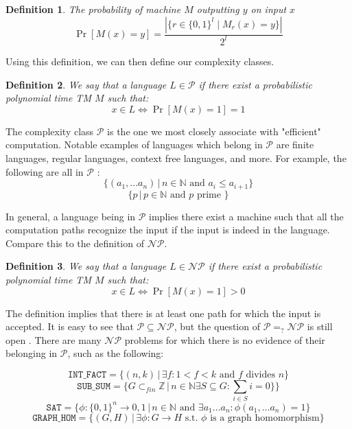 \documentclass{article}
\newtheorem{definition}{Definition}
\begin{document}
\begin{definition} The probability of machine $M$ outputting $y$ on input $x$
\[ \Pr[M(x) = y] = \frac{|\{r \in \{0, 1\}^{l} \mid M_r(x) = y \}|}{2^{l}}\]
\end{definition}

Using this definition, we can then define our complexity classes. 

\begin{definition}
We say that a language $L \in \mathcal{P}$ if there exist a probabilistic polynomial time TM $M$ such that:
\[x \in L \iff \Pr[M(x) = 1] = 1\]
\end{definition}

The complexity class $\mathcal{P}$ is the one we most closely associate with "efficient" computation. Notable examples of languages which belong in $\mathcal{P}$ are finite languages, regular languages, context free languages, and more. For example, the following are all in $\mathcal{P}$ : 
\[ \{(a_1, ... a_n) \, | \, n \in \mathbb{N} \text{ and } a_i \leq a_{i+1} \}\]
\[ \{ p \,|\, p \in \mathbb{N} \text{ and } p \text{ prime } \}\]

In general, a language being in $\mathcal{P}$ implies there exist a machine such that all the computation paths recognize the input if the input is indeed in the language. \\

Compare this to the definition of $\mathcal{NP}$.

\begin{definition}
We say that a language $L \in \mathcal{NP}$ if there exist a probabilistic polynomial time TM $M$ such that:
\[x \in L \iff \Pr[M(x) = 1] > 0\]
\end{definition}

The definition implies that there is at least one path for which the input is accepted. It is easy to see that $\mathcal{P} \subseteq \mathcal{NP}$, but the question of $\mathcal{P} =_? \mathcal{NP}$ is still open \cite{cookComplexityTheoremprovingProcedures1971} \cite{jaffeMillenniumGrandChallenge2006}. There are many $\mathcal{NP}$ problems for which there is no evidence of their belonging in $\mathcal{P}$, such as the following:

\[ \texttt{INT\_FACT} = \{ (n, k) \, | \, \exists f : 1 < f < k \text { and } f \text{ divides } n\}\]
\[\texttt{SUB\_SUM} = \{ G \subset_{fin} \mathbb{Z} \, | \, n \in \mathbb{N} \exists S \subseteq G : \sum_{i \in S} i = 0  \} \}\]
\[ \texttt{SAT} = \{ \phi : \{0,1\}^n \to {0,1} \, | \, n \in \mathbb{N} \text{ and } \exists a_1 \dots a_n : \phi(a_1, \dots a_n) = 1 \} \]
\[ \texttt{GRAPH\_HOM} = \{ (G, H) \, | \, \exists \phi : G \to H \text{ s.t. $\phi$ is a graph homomorphism} \}\]
\end{document}
